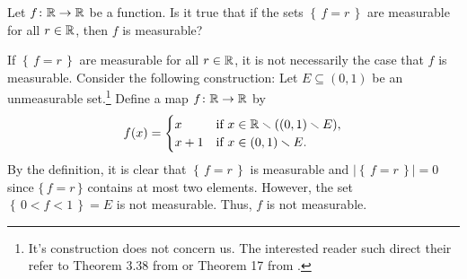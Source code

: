 \begin{problem}
  Let $f\colon\mathbb{R}\to\mathbb{R}$ be a function. Is it true that if the sets
  $\left\{\,f=r\,\right\}$ are measurable for all $r\in\mathbb{R}$, then $f$ is
  measurable?
\end{problem}
\begin{solution}
  If $\left\{\,f=r\,\right\}$ are measurable for all $r\in\mathbb{R}$, it is not
  necessarily the case that $f$ is measurable. Consider the following
  construction: Let $E\subseteq(0,1)$ be an unmeasurable set.\footnote{It's
    construction does not concern us. The interested reader such direct
    their refer to Theorem 3.38 from \cite[Ch.\@ 3, p.\@
    57-58]{wheeden-zygmund} or Theorem 17 from \cite[Ch.\@ 2\S 7, p.\@
    48]{royden}.} Define a map $f\colon\mathbb{R}\to\mathbb{R}$ by
  \begin{equation}
    \label{eq:prep:1:11}
    f(x)=
    \begin{cases}
      x&\text{if $x\in\mathbb{R}\smallsetminus((0,1)\smallsetminus E)$},\\
      x+1&\text{if $x\in (0,1)\smallsetminus E$.}
    \end{cases}
  \end{equation}
  By the definition, it is clear that $\left\{\,f=r\,\right\}$ is
  measurable and $\left|\left\{\,f=r\,\right\}\right|=0$ since
  $\{\,f=r\,\}$ contains at most two elements. However, the set
  $\left\{\,0<f<1\,\right\}=E$ is not measurable. Thus, $f$ is not
  measurable.
\end{solution}

